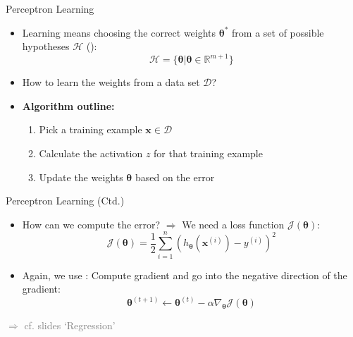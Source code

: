\begin{frame}{Perceptron Learning}{}
	\begin{itemize}
		\item Learning means choosing the correct weights $\bm{\theta}^*$ from a set of possible hypotheses $\mathcal{H}$
		():
		\begin{equation*}
			\mathcal{H} = \{ \bm{\theta} \vert \bm{\theta} \in \mathbb{R}^{m + 1} \}
		\end{equation*}
		\item How to learn the weights from a data set $\mathcal{D}$?
		\item \textbf{Algorithm outline:}
		\begin{enumerate}
			\item Pick a training example $\bm{x} \in \mathcal{D}$
			\item Calculate the activation $z$ for that training example
			\item Update the weights $\bm{\theta}$ based on the error
		\end{enumerate}
	\end{itemize}
\end{frame}


\begin{frame}{Perceptron Learning (Ctd.)}{}
	\begin{itemize}
		\item How can we compute the error? $\Rightarrow$ We need a loss function $\mathcal{J}(\bm{\theta})$:
		\begin{equation}
			\mathcal{J}(\bm{\theta}) = \frac{1}{2} \sum_{i=1}^n (h_{\bm{\theta}}(\bm{x}^{(i)}) - y^{(i)})^2
		\end{equation}
		\item Again, we use : Compute gradient and go into the negative direction of the gradient:
		\begin{equation}
			\bm{\theta}^{(t+1)} \longleftarrow \bm{\theta}^{(t)} - \alpha \nabla_{\bm{\theta}} \mathcal{J}(\bm{\theta})
		\end{equation}
	\end{itemize}
	\textcolor{gray}{$\Rightarrow$ cf. slides `Regression'}
\end{frame}



